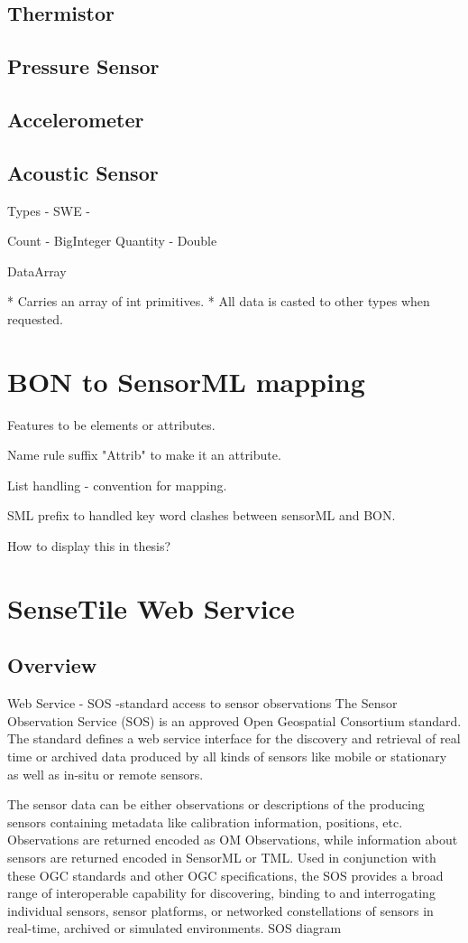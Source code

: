 \documentclass[]{final_report}
\begin{document}
\subsection{Thermistor}
\subsection{Pressure Sensor}
\subsection{Accelerometer}
\subsection{Acoustic Sensor}

Types
 - SWE -

Count - BigInteger
Quantity - Double

DataArray

 * Carries an array of int primitives.
 * All data is casted to other types when requested.


\newpage
\section{BON to SensorML mapping}
Features to be elements or attributes.

Name rule suffix "Attrib" to make it an attribute.

List handling - convention for mapping.

SML prefix to handled key word clashes between sensorML and BON.

How to display this in thesis?
\section{SenseTile Web Service}
\subsection{Overview}

Web Service - SOS -standard access to sensor observations
The Sensor Observation Service (SOS) is an approved Open Geospatial Consortium standard. The standard defines a web service interface for the discovery and retrieval of real time or archived data produced by all kinds of sensors like mobile or stationary as well as in-situ or remote sensors.

The sensor data can be either observations or descriptions of the producing sensors containing metadata like calibration information, positions, etc. Observations are returned encoded as OM Observations, while information about sensors are returned encoded in SensorML or TML. Used in conjunction with these OGC standards and other OGC specifications, the SOS provides a broad range of interoperable capability for discovering, binding to and interrogating individual sensors, sensor platforms, or networked constellations of sensors in real-time, archived or simulated environments. 
SOS diagram
\end{document}

